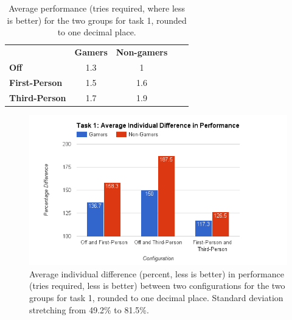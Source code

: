 \documentclass[runningheads,a4paper,oribibl]{llncs}
\begin{document}
\begin{table}[]
\centering
\label{tab:Task1GraphP}
\setlength{\tabcolsep}{1em}
\def\arraystretch{1.8}
\begin{tabular}{l|c|cll}
                      & {\textbf{Gamers}} & {\textbf{Non-gamers}} &  &  \\ \cline{1-3}
\textbf{Off}          & 1.3                                    & 1                                          &  &  \\ \cline{1-3}
\textbf{First-Person} & 1.5                                    & 1.6                                        &  &  \\ \cline{1-3}
\textbf{Third-Person} & 1.7                                    & 1.9                                        &  & 
\end{tabular}
\caption{Average performance (tries required, where less is better) for the two groups for task 1, rounded to one decimal place.}
\end{table}





\begin{figure}
   \centering
   \includegraphics[width=\textwidth]{ExternalMaterial/Task1GraphD}
   \caption{Average individual difference (percent, less is better) in performance (tries required, less is better) between two configurations for the two groups for task 1, rounded to one decimal place. Standard deviation stretching from 49.2\% to 81.5\%.} \label{fig:Task1GraphD}
\end{figure}
\end{document}
